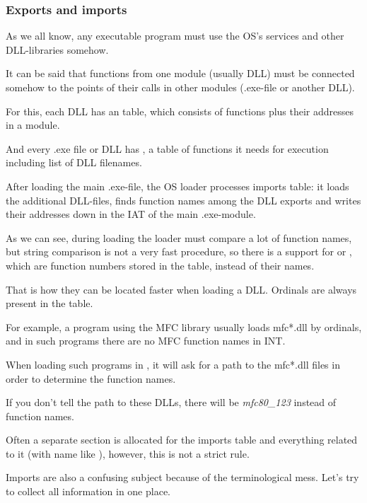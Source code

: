 \subsubsection{Exports and imports}

\label{PE_exports_imports}
As we all know, any executable program must use the \ac{OS}'s services and other DLL-libraries somehow.

It can be said that functions from one module (usually DLL) must be connected somehow to the points of their
calls in other modules (.exe-file or another DLL).

For this, each DLL has an  table, which consists of functions plus their addresses in a module.

And every .exe file or DLL has , a table of functions it needs for execution including
list of DLL filenames.

After loading the main .exe-file, the \ac{OS} loader processes imports table:
it loads the additional DLL-files, finds function names
among the DLL exports and writes their addresses down in the \ac{IAT} of the main .exe-module.


As we can see, during loading the loader must compare a lot of function names, but string comparison is not a very
fast procedure, so there is a support for  or ,
which are function numbers stored in the table, instead of their names.

That is how they can be located faster when loading a DLL.
Ordinals are always present in the  table.

For example, a program using the \ac{MFC} library usually loads mfc*.dll by ordinals,
and in such programs there are no \ac{MFC} function names in \ac{INT}.

When loading such programs in \IDA, it will ask for a path to the mfc*.dll files
in order to determine the function names.

If you don't tell \IDA the path to these DLLs, there will be \emph{mfc80\_123} instead of function names.


Often a separate section is allocated for the imports table and everything related to it (with name like ),
however, this is not a strict rule.

Imports are also a confusing subject because of the terminological mess. Let's try to collect all information in one place.

